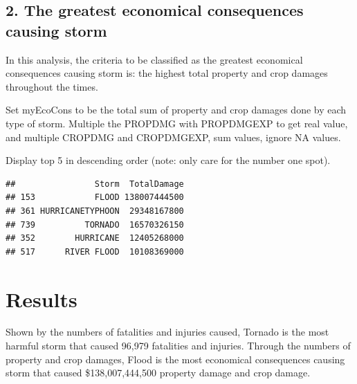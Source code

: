 \documentclass[]{article}
\newenvironment{Shaded}{\begin{snugshade}}{\end{snugshade}}
\newcommand{\KeywordTok}[1]{\textcolor[rgb]{0.13,0.29,0.53}{\textbf{{#1}}}}
\newcommand{\DataTypeTok}[1]{\textcolor[rgb]{0.13,0.29,0.53}{{#1}}}
\newcommand{\DecValTok}[1]{\textcolor[rgb]{0.00,0.00,0.81}{{#1}}}
\newcommand{\StringTok}[1]{\textcolor[rgb]{0.31,0.60,0.02}{{#1}}}
\newcommand{\OtherTok}[1]{\textcolor[rgb]{0.56,0.35,0.01}{{#1}}}
\newcommand{\NormalTok}[1]{{#1}}
\begin{document}
\subsection{2. The greatest economical consequences causing
storm}\label{the-greatest-economical-consequences-causing-storm}

In this analysis, the criteria to be classified as the greatest
economical consequences causing storm is: the highest total property and
crop damages throughout the times.

Set myEcoCons to be the total sum of property and crop damages done by
each type of storm. Multiple the PROPDMG with PROPDMGEXP to get real
value, and multiple CROPDMG and CROPDMGEXP, sum values, ignore NA
values.

\begin{Shaded}
\end{Shaded}

Display top 5 in descending order (note: only care for the number one
spot).

\begin{Shaded}
\end{Shaded}

\begin{verbatim}
##                Storm  TotalDamage
## 153            FLOOD 138007444500
## 361 HURRICANETYPHOON  29348167800
## 739          TORNADO  16570326150
## 352        HURRICANE  12405268000
## 517      RIVER FLOOD  10108369000
\end{verbatim}

\section{Results}\label{results}

Shown by the numbers of fatalities and injuries caused, Tornado is the
most harmful storm that caused 96,979 fatalities and injuries. Through
the numbers of property and crop damages, Flood is the most economical
consequences causing storm that caused \$138,007,444,500 property damage
and crop damage.
\end{document}
